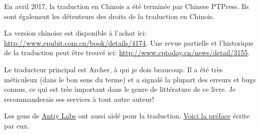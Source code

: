 En avril 2017, la traduction en Chinois a été terminée par Chinese PTPress. Ils sont
également les détenteurs des droits de la traduction en Chinois.

La version chinoise est disponible à l'achat ici: \url{http://www.epubit.com.cn/book/details/4174}.
Une revue partielle et l'historique de la traduction peut être trouvé ici: \url{http://www.cptoday.cn/news/detail/3155}.


Le traducteur principal est Archer, à qui je dois beaucoup. Il a été très méticuleux
(dans le bon sens du terme) et a signalé la plupart des erreurs et bugs connus, ce
qui est très important dans le genre de littérature de ce livre.
Je recommanderais ses services à tout autre auteur!

Les gens de \href{http://www.antiy.net/}{Antiy Labs} ont aussi aidé pour la traduction.
\href{http://www.epubit.com.cn/book/onlinechapter/51413}{Voici la préface} écrite par eux.
